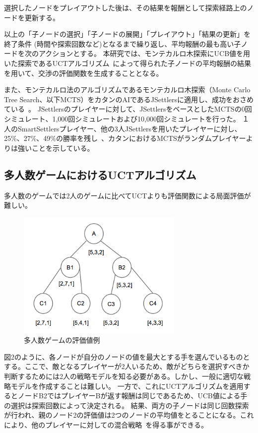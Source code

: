 \documentclass[a4, 10pt,dvipdfmx]{jsarticle}
\begin{document}
選択したノードをプレイアウトした後は、その結果を報酬として探索経路上のノードを更新する。

以上の「子ノードの選択」「子ノードの展開」「プレイアウト」「結果の更新」を終了条件 (時間や探索回数など)となるまで繰り返し、平均報酬の最も高い子ノードを次のアクションとする。
本研究では、モンテカルロ木探索にUCB値を用いた探索であるUCTアルゴリズム~\cite{kocsis2006bandit,auer2002finite}によって得られた子ノードの平均報酬の結果を用いて、交渉の評価関数を生成することとなる。

また、モンテカルロ法のアルゴリズムであるモンテカルロ木探索（Monte Carlo Tree Search、以下MCTS）をカタンのAIであるJSettlersに適用し、成功をおさめている~\cite{branca2007using}。
JSettlersのプレイヤーに対して、JSettlersをベースとしたMCTSの0回シミュレート、1,000回シミュレートおよび10,000回シミュレートを行った。
１人のSmartSettlersプレイヤー、他の3人JSettlersを用いたプレイヤーに対し、25\%、27\%、49\%の勝率を残し~\cite{szita2010monte}、カタンにおけるMCTSがランダムプレイヤーよりは強いことを示している。

\subsection{多人数ゲームにおけるUCTアルゴリズム}

多人数のゲームでは2人のゲームに比べてUCTよりも評価関数による局面評価が難しい。~\cite{sturtevant2008analysis}

\begin{figure}[t]
    \begin{center}
      \includegraphics[width=80mm]{img/multi_agent_tree.png}
    \end{center}
    \caption{多人数ゲームの評価値例}
    \label{multi_agent_tree}
\end{figure}

図2のように、各ノードが自分のノードの値を最大とする手を選んでいるものとする。ここで、敵となるプレイヤーが2人いるため、敵がどちらを選択すべきか判断するためには2人の戦略モデルを知る必要がある。しかし、一般に適切な戦略モデルを作成することは難しい。
一方で、これにUCTアルゴリズムを適用するとノードB2ではプレイヤーBが返す報酬は同じであるため、UCB値による手の選択は探索回数によって決定される。
結果、両方の子ノードは同じ回数探索が行われ、親のノード2の評価値は2つのノードの平均値をとることになる。これにより、他のプレイヤーに対しての混合戦略~\cite{nash1951non}を得る事ができる。
\end{document}
